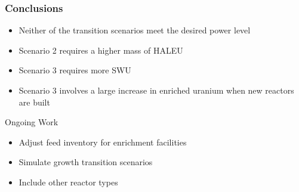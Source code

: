 \begin{frame}
\frametitle{Conclusions}
    \begin{itemize}
        \item Neither of the transition scenarios meet the desired power level
        \item Scenario 2 requires a higher mass of \gls{HALEU}
        \item Scenario 3 requires more \gls{SWU}
        \item Scenario 3 involves a large increase in enriched uranium when 
              new reactors are built
    \end{itemize}

    \begin{block}{Ongoing Work}
        \begin{itemize}
            \item Adjust feed inventory for enrichment facilities
            \item Simulate growth transition scenarios
            \item Include other reactor types
        \end{itemize}
    \end{block}
    

\end{frame}
